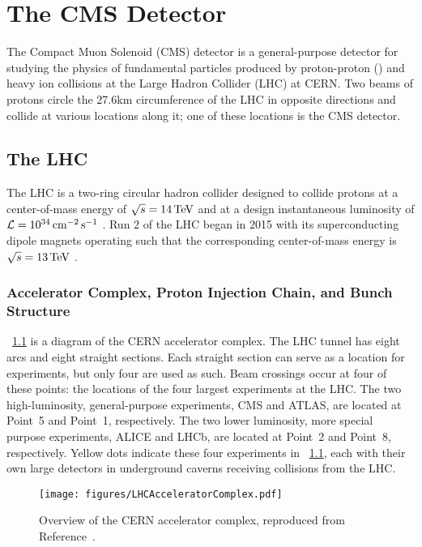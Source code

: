 \chapter{The CMS Detector}

The Compact Muon Solenoid (CMS) detector is a general-purpose detector for studying the physics of fundamental particles produced by proton-proton (\pp) and heavy ion collisions at the Large Hadron Collider (LHC) at CERN.
Two beams of protons circle the 27.6\unit{km} circumference of the LHC in opposite directions and collide at various locations along it; one of these locations is the CMS detector.

\section{The LHC}
The LHC is a two-ring circular hadron collider designed to collide protons at a center-of-mass energy of $\sqrt{s} = 14\,\text{Te\hspace{-.08em}V}$ and at a design instantaneous luminosity of $\mathcal{L} = 10^{34} \,\text{cm}^{-2} \text{\,s}^{-1}$ \cite{Evans:2008zzb}.
Run 2 of the LHC began in 2015 with its superconducting dipole magnets operating such that the corresponding center-of-mass energy is $\sqrt{s} = 13\,\text{Te\hspace{-.08em}V}$ \cite{Todesco:2017tcj}.

\subsection{Accelerator Complex, Proton Injection Chain, and Bunch Structure}
\Fig~\ref{cms:lhc} is a diagram of the CERN accelerator complex.
The LHC tunnel has eight arcs and eight straight sections.
Each straight section can serve as a location for experiments, but only four are used as such.
Beam crossings occur at four of these points: the locations of the four largest experiments at the LHC.
The two high-luminosity, general-purpose experiments, CMS and ATLAS, are located at Point~5 and Point~1, respectively.
The two lower luminosity, more special purpose experiments, ALICE and LHCb, are located at Point~2 and Point~8, respectively.
Yellow dots indicate these four experiments in \Fig~\ref{cms:lhc}, each with their own large detectors in underground caverns receiving collisions from the LHC.

\begin{figure}[tpb]
  \centering
  \texttt{[image: figures/LHCAcceleratorComplex.pdf]}
  \caption{Overview of the CERN accelerator complex, reproduced from Reference~\cite{Mobs:2636343}.}
  \label{cms:lhc}
\end{figure}

